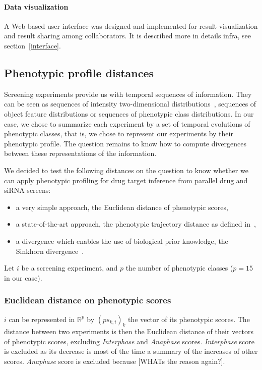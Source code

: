 \paragraph{Data visualization}
A Web-based user interface was designed and implemented for result visualization and result sharing among collaborators. It is described more in details infra, see section~\ref{interface}.

\subsection{Phenotypic profile distances}
\label{sec:distances}
Screening experiments provide us with temporal sequences of information. They can be seen as sequences of intensity two-dimensional distributions~\cite{pmid22743764}, sequences of object feature distributions or sequences of phenotypic class distributions. In our case, we chose to summarize each experiment by a set of temporal evolutions of phenotypic classes, that is, we chose to represent our experiments by their phenotypic profile. The question remains to know how to compute divergences between these representations of the information.

We decided to test the following distances on the question to know whether we can apply phenotypic profiling for drug target inference from parallel drug and siRNA screens:
\begin{itemize}
\item a very simple approach, the Euclidean distance of phenotypic scores, 
\item a state-of-the-art approach, the phenotypic trajectory distance as defined in~\cite{Walter2010},
\item a divergence which enables the use of biological prior knowledge, the Sinkhorn divergence~\cite{sinkhorn}.
\end{itemize}

Let $i$ be a screening experiment, and $p$ the number of phenotypic classes ($p=15$ in our case). 
\subsubsection{Euclidean distance on phenotypic scores}
$i$ can be represented in $\mathbb{R}^p$ by $(ps_{k,i})_k$ the vector of its phenotypic scores. The distance between two experiments is then the Euclidean distance of their vectors of phenotypic scores, excluding \textit{Interphase} and \textit{Anaphase} scores. \textit{Interphase} score is excluded as its decrease is most of the time a summary of the increases of other scores. \textit{Anaphase} score is excluded because [WHATs the reason again?]. 

